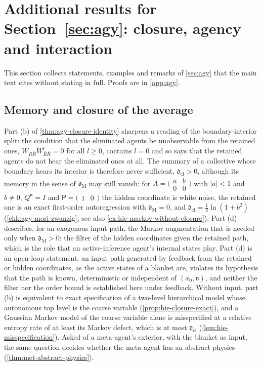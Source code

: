\section{Additional results for \texorpdfstring{Section~\ref{sec:agy}}{Section 5}: closure, agency and interaction}\label{sup:agy}

This section collects statements, examples and remarks of \cref{sec:agy} that the main text cites without stating in full. Proofs are in \cref{app:agy}.

\subsection{Memory and closure of the average}\label{sup:agy-memory-and-closure-of-the-average}

Part (b) of \cref{thm:agy-closure-identity} sharpens a reading of the boundary-interior split: the condition that the eliminated agents be unobservable from the retained ones, $W_{R\bar R}W_{\bar R\bar R}^l=0$ for all $l\ge0$, contains $l=0$ and so says that the retained agents do not hear the eliminated ones at all. The summary of a collective whose boundary hears its interior is therefore never sufficient, $\mathfrak d_{\mathrm{cl}}>0$, although its memory in the sense of $\mathfrak d_{\mathrm M}$ may still vanish: for $A=\bigl(\begin{smallmatrix}a&b\\0&0\end{smallmatrix}\bigr)$ with $\lvert a\rvert<1$ and $b\ne0$, $Q^{\mathfrak n}=I$ and $\mathsf P=\bigl(\begin{smallmatrix}1&0\end{smallmatrix}\bigr)$ the hidden coordinate is white noise, the retained one is an exact first-order autoregression with $\mathfrak d_{\mathrm M}=0$, and $\mathfrak d_{\mathrm{cl}}=\frac12\ln(1+b^2)$ (\cref{chk:agy-mori-zwanzig}; see also \cref{ex:hie-markov-without-closure}). Part (d) describes, for an exogenous input path, the Markov augmentation that is needed only when $\mathfrak d_{\mathrm M}>0$: the filter of the hidden coordinates given the retained path, which is the role that an active-inference agent's internal states play. Part (d) is an open-loop statement: an input path generated by feedback from the retained or hidden coordinates, as the active states of a blanket are, violates its hypothesis that the path is known, deterministic or independent of $(x_0,\mathfrak n)$, and neither the filter nor the order bound is established here under feedback. Without input, part (b) is equivalent to exact specification of a two-level hierarchical model whose autonomous top level is the coarse variable (\cref{prop:hie-closure-exact}), and a Gaussian Markov model of the coarse variable alone is misspecified at a relative entropy rate of at least its Markov defect, which is at most $\mathfrak d_{\mathrm{cl}}$ (\cref{lem:hie-misspecification}). Asked of a meta-agent's exterior, with the blanket as input, the same question decides whether the meta-agent has an abstract physics (\cref{thm:met-abstract-physics}).

